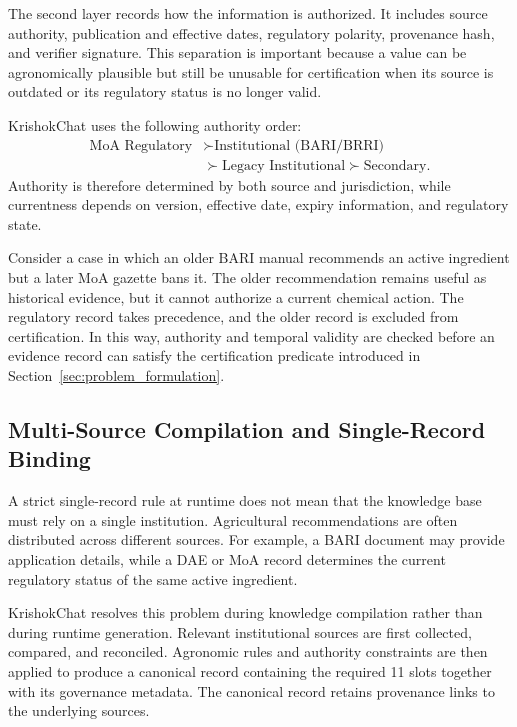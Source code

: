 \documentclass[a4paper,fleqn]{cas-dc}
\begin{document}
The second layer records how the information is authorized. It includes source authority, publication and effective dates, regulatory polarity, provenance hash, and verifier signature. This separation is important because a value can be agronomically plausible but still be unusable for certification when its source is outdated or its regulatory status is no longer valid.

KrishokChat uses the following authority order:
\begin{equation}
\begin{aligned}
\text{MoA Regulatory} &\succ \text{Institutional (BARI/BRRI)} \\
&\succ \text{Legacy Institutional} \succ \text{Secondary}.
\end{aligned}
\end{equation}
Authority is therefore determined by both source and jurisdiction, while currentness depends on version, effective date, expiry information, and regulatory state.

Consider a case in which an older BARI manual recommends an active ingredient but a later MoA gazette bans it. The older recommendation remains useful as historical evidence, but it cannot authorize a current chemical action. The regulatory record takes precedence, and the older record is excluded from certification. In this way, authority and temporal validity are checked before an evidence record can satisfy the certification predicate introduced in Section~\ref{sec:problem_formulation}.

\subsection{Multi-Source Compilation and Single-Record Binding}

A strict single-record rule at runtime does not mean that the knowledge base must rely on a single institution. Agricultural recommendations are often distributed across different sources. For example, a BARI document may provide application details, while a DAE or MoA record determines the current regulatory status of the same active ingredient.

KrishokChat resolves this problem during knowledge compilation rather than during runtime generation. Relevant institutional sources are first collected, compared, and reconciled. Agronomic rules and authority constraints are then applied to produce a canonical record containing the required 11 slots together with its governance metadata. The canonical record retains provenance links to the underlying sources.
\end{document}
